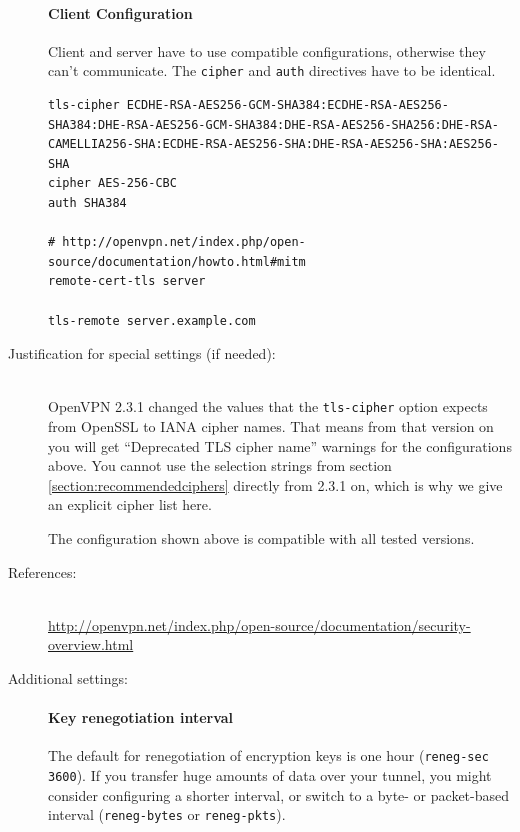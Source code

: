 \begin{description}
\paragraph{Client Configuration}\mbox{}

Client and server have to use compatible configurations, otherwise they can't communicate.
The \verb|cipher| and \verb|auth| directives have to be identical.

\begin{lstlisting}[breaklines]
tls-cipher ECDHE-RSA-AES256-GCM-SHA384:ECDHE-RSA-AES256-SHA384:DHE-RSA-AES256-GCM-SHA384:DHE-RSA-AES256-SHA256:DHE-RSA-CAMELLIA256-SHA:ECDHE-RSA-AES256-SHA:DHE-RSA-AES256-SHA:AES256-SHA
cipher AES-256-CBC
auth SHA384

# http://openvpn.net/index.php/open-source/documentation/howto.html#mitm
remote-cert-tls server

tls-remote server.example.com
\end{lstlisting}

\item[Justification for special settings (if needed):] \mbox{}\\

OpenVPN 2.3.1 changed the values that the \verb|tls-cipher| option
expects from OpenSSL to IANA cipher names. That means from that
version on you will get ``Deprecated TLS cipher name'' warnings for
the configurations above. You cannot use the selection strings from
section \ref{section:recommendedciphers} directly from 2.3.1 on, which
is why we give an explicit cipher list here.

The configuration shown above is compatible with all tested versions.

\item[References:] \mbox{}\\

\url{http://openvpn.net/index.php/open-source/documentation/security-overview.html}



\item[Additional settings:] \mbox{}

\paragraph{Key renegotiation interval}\mbox{}

The default for renegotiation of encryption keys is one hour
(\verb|reneg-sec 3600|). If you
transfer huge amounts of data over your tunnel, you might consider
configuring a shorter interval, or switch to a byte- or packet-based
interval (\verb|reneg-bytes| or \verb|reneg-pkts|).


\end{description}
